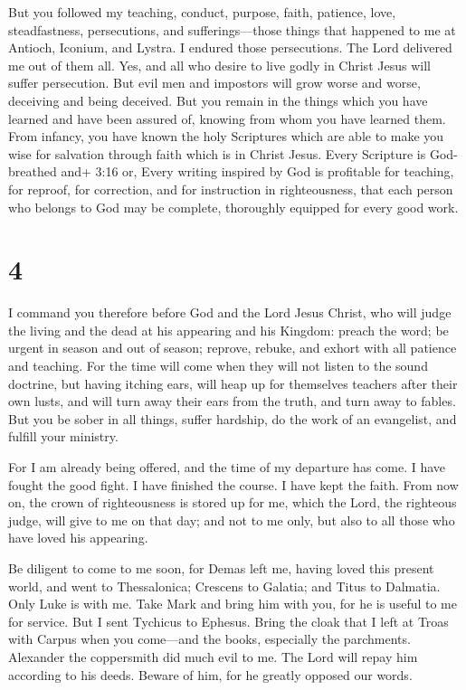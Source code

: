  But you followed my teaching, conduct, purpose, faith,
patience, love, steadfastness,  persecutions, and
sufferings---those things that happened to me at Antioch, Iconium, and
Lystra. I endured those persecutions. The Lord delivered me out of them
all.  Yes, and all who desire to live godly in Christ Jesus
will suffer persecution.  But evil men and impostors will
grow worse and worse, deceiving and being deceived.  But
you remain in the things which you have learned and have been assured
of, knowing from whom you have learned them.  From infancy,
you have known the holy Scriptures which are able to make you wise for
salvation through faith which is in Christ Jesus.  Every
Scripture is God-breathed and+ 3:16 or, Every writing inspired by God is
profitable for teaching, for reproof, for correction, and for
instruction in righteousness,  that each person who belongs
to God may be complete, thoroughly equipped for every good work.

\hypertarget{section-3}{%
\section{4}\label{section-3}}

 I command you therefore before God and the Lord Jesus
Christ, who will judge the living and the dead at his appearing and his
Kingdom:  preach the word; be urgent in season and out of
season; reprove, rebuke, and exhort with all patience and teaching.
 For the time will come when they will not listen to the
sound doctrine, but having itching ears, will heap up for themselves
teachers after their own lusts,  and will turn away their
ears from the truth, and turn away to fables.  But you be
sober in all things, suffer hardship, do the work of an evangelist, and
fulfill your ministry.

 For I am already being offered, and the time of my
departure has come.  I have fought the good fight. I have
finished the course. I have kept the faith.  From now on,
the crown of righteousness is stored up for me, which the Lord, the
righteous judge, will give to me on that day; and not to me only, but
also to all those who have loved his appearing.

 Be diligent to come to me soon,  for Demas
left me, having loved this present world, and went to Thessalonica;
Crescens to Galatia; and Titus to Dalmatia.  Only Luke is
with me. Take Mark and bring him with you, for he is useful to me for
service.  But I sent Tychicus to Ephesus. 
Bring the cloak that I left at Troas with Carpus when you come---and the
books, especially the parchments.  Alexander the
coppersmith did much evil to me. The Lord will repay him according to
his deeds.  Beware of him, for he greatly opposed our
words.

